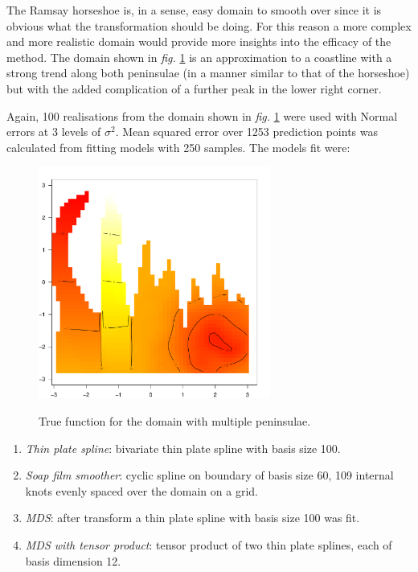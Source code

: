 \documentclass[a4paper,10pt]{article}
\newcommand{\fig}[1]{\emph{fig.} \ref{#1}}
\begin{document}
The Ramsay horseshoe is, in a sense, easy domain to smooth over since it is obvious what the transformation should be doing. For this reason a more complex and more realistic domain would provide more insights into the efficacy of the method. The domain shown in \fig{wt2-truth} is an approximation to a coastline with a strong trend along both peninsulae (in a manner similar to that of the horseshoe) but with the added complication of a further peak in the lower right corner.

Again, 100 realisations from the domain shown in \fig{wt2-truth} were used with Normal errors at 3 levels of $\sigma^2$. Mean squared error over 1253 prediction points was calculated from fitting models with 250 samples. The models fit were:

\begin{figure}
\centering
\includegraphics[width=3in]{figs/wt2-truth.pdf} \\
\caption{True function for the domain with multiple peninsulae.}
\label{wt2-truth}
\end{figure}

\begin{enumerate}
\item \emph{Thin plate spline}: bivariate thin plate spline with basis size 100. 
\item \emph{Soap film smoother}: cyclic spline on boundary of basis size 60, 109 internal knots evenly spaced over the domain on a grid.
\item \emph{MDS}: after transform a thin plate spline with basis size 100 was fit. 
\item \emph{MDS with tensor product}: tensor product of two thin plate splines, each of basis dimension 12.
\end{enumerate} 
\end{document}
